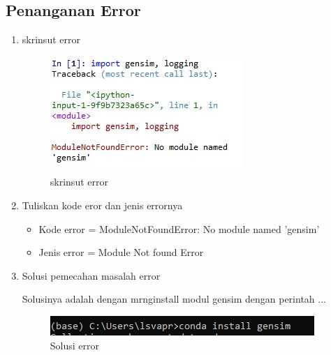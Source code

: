 \subsection{Penanganan Error}
\begin{enumerate} 
	\item skrinsut error
		\begin{figure}[ht]
		\centering
		\includegraphics[scale=0.5]{figures/chapter5/16error.jpg}
		\caption{skrinsut error}
		\label{contoh}
		\end{figure}
	\item Tuliskan kode eror dan jenis errornya
		\begin{itemize}
		\item Kode error = ModuleNotFoundError: No module named 'gensim'
		\item Jenis error = Module Not found Error
		\end{itemize}
	\item Solusi pemecahan masalah error
		\par Solusinya adalah dengan mrnginstall modul gensim dengan perintah ...
		\begin{figure}[ht]
		\centering
		\includegraphics[scale=0.5]{figures/chapter5/17solusi.jpg}
		\caption{Solusi error}
		\label{contoh}
		\end{figure}
	
\end{enumerate}